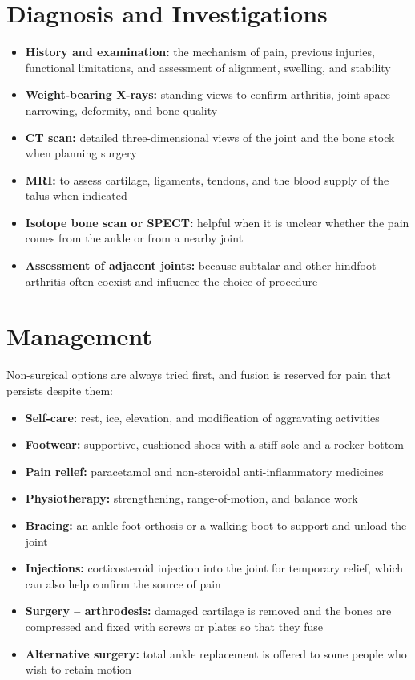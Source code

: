 \section*{Diagnosis and Investigations}
\begin{itemize}
    \item \textbf{History and examination:} the mechanism of pain, previous injuries, functional limitations, and assessment of alignment, swelling, and stability
    \item \textbf{Weight-bearing X-rays:} standing views to confirm arthritis, joint-space narrowing, deformity, and bone quality
    \item \textbf{CT scan:} detailed three-dimensional views of the joint and the bone stock when planning surgery
    \item \textbf{MRI:} to assess cartilage, ligaments, tendons, and the blood supply of the talus when indicated
    \item \textbf{Isotope bone scan or SPECT:} helpful when it is unclear whether the pain comes from the ankle or from a nearby joint
    \item \textbf{Assessment of adjacent joints:} because subtalar and other hindfoot arthritis often coexist and influence the choice of procedure
\end{itemize}

\section*{Management}
Non-surgical options are always tried first, and fusion is reserved for pain that persists despite them:

\begin{itemize}
    \item \textbf{Self-care:} rest, ice, elevation, and modification of aggravating activities
    \item \textbf{Footwear:} supportive, cushioned shoes with a stiff sole and a rocker bottom
    \item \textbf{Pain relief:} paracetamol and non-steroidal anti-inflammatory medicines
    \item \textbf{Physiotherapy:} strengthening, range-of-motion, and balance work
    \item \textbf{Bracing:} an ankle-foot orthosis or a walking boot to support and unload the joint
    \item \textbf{Injections:} corticosteroid injection into the joint for temporary relief, which can also help confirm the source of pain
    \item \textbf{Surgery -- arthrodesis:} damaged cartilage is removed and the bones are compressed and fixed with screws or plates so that they fuse
    \item \textbf{Alternative surgery:} total ankle replacement is offered to some people who wish to retain motion
\end{itemize}

